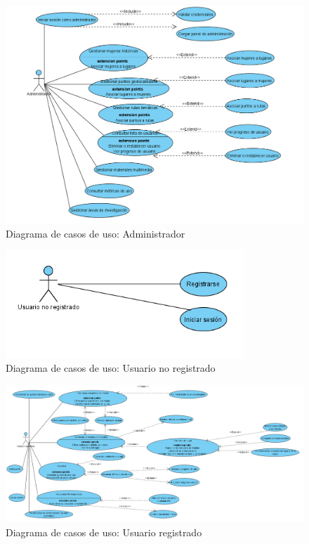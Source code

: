 \begin{figure}[H]
    \centering
    \includegraphics[width=1\textwidth]{figs/diagrama_administrador.png}
    \caption{Diagrama de casos de uso: Administrador}
\end{figure}

\begin{figure}[H]
    \centering
    \includegraphics[width=0.8\textwidth]{figs/diagrama_usuario_no_registrado.png}
    \caption{Diagrama de casos de uso: Usuario no registrado}
\end{figure}


\begin{figure}
    \centering
    \includegraphics[width=1\textwidth]{figs/diagrama_usuario_registrado.png}
    \caption{Diagrama de casos de uso: Usuario registrado}
\end{figure}


